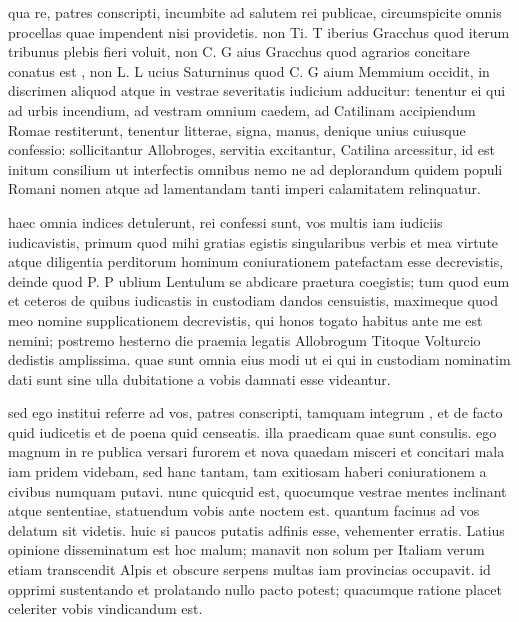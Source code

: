 qua re, patres conscripti, incumbite ad salutem rei publicae, circumspicite omnis procellas quae impendent nisi providetis. non Ti. T iberius Gracchus quod iterum tribunus plebis fieri voluit, non C. G aius Gracchus quod agrarios concitare conatus est , non L. L ucius Saturninus quod C. G aium Memmium occidit, in discrimen aliquod atque in vestrae severitatis iudicium adducitur: tenentur ei qui ad urbis incendium, ad vestram omnium caedem, ad Catilinam accipiendum Romae restiterunt, tenentur litterae, signa, manus, denique unius cuiusque confessio: sollicitantur Allobroges, servitia excitantur, Catilina arcessitur, id est initum consilium ut interfectis omnibus nemo ne ad deplorandum quidem populi Romani nomen atque ad lamentandam tanti imperi calamitatem relinquatur.

 haec omnia indices detulerunt, rei confessi sunt, vos multis iam iudiciis iudicavistis, primum quod mihi gratias egistis singularibus verbis et mea virtute atque diligentia perditorum hominum coniurationem patefactam esse decrevistis, deinde quod P. P ublium Lentulum se abdicare praetura coegistis; tum quod eum et ceteros de quibus iudicastis in custodiam dandos censuistis, maximeque quod meo nomine supplicationem decrevistis, qui honos togato habitus ante me est nemini; postremo hesterno die praemia legatis Allobrogum Titoque Volturcio dedistis amplissima. quae sunt omnia eius modi ut ei qui in custodiam nominatim dati sunt sine ulla dubitatione a vobis damnati esse videantur.

 sed ego institui referre ad vos, patres conscripti, tamquam integrum , et de facto quid iudicetis et de poena quid censeatis. illa praedicam quae sunt consulis. ego magnum in re publica versari furorem et nova quaedam misceri et concitari mala iam pridem videbam, sed hanc tantam, tam exitiosam haberi coniurationem a civibus numquam putavi. nunc quicquid est, quocumque vestrae mentes inclinant atque sententiae, statuendum vobis ante noctem est. quantum facinus ad vos delatum sit videtis. huic si paucos putatis adfinis esse, vehementer erratis. Latius opinione disseminatum est hoc malum; manavit non solum per Italiam verum etiam transcendit Alpis et obscure serpens multas iam provincias occupavit. id opprimi sustentando et prolatando nullo pacto potest; quacumque ratione placet celeriter vobis vindicandum est.

